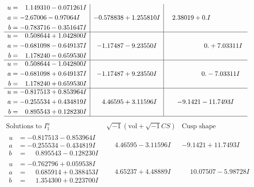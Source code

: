 \documentclass[1p]{elsarticle_modified}
\theoremstyle{definition}
\newcommand{\I}{\sqrt{-1}}
\begin{document}
$$\begin{array}{c|c|c}
\begin{aligned}
u &= \phantom{-}1.149310 - 0.071261 I \\
a &= -2.67006 - 0.97064 I \\
b &= -0.783716 - 0.351647 I\end{aligned}
 & -0.578838 + 1.255810 I & \phantom{-}2.38019 + 0. I\phantom{ +0.000000I} \\ \hline\begin{aligned}
u &= \phantom{-}0.508644 + 1.042800 I \\
a &= -0.681098 - 0.649137 I \\
b &= \phantom{-}1.178240 - 0.659530 I\end{aligned}
 & -1.17487 - 9.23550 I & \phantom{-0.000000 -}0. + 7.03311 I \\ \hline\begin{aligned}
u &= \phantom{-}0.508644 - 1.042800 I \\
a &= -0.681098 + 0.649137 I \\
b &= \phantom{-}1.178240 + 0.659530 I\end{aligned}
 & -1.17487 + 9.23550 I & \phantom{-0.000000 } 0. - 7.03311 I \\ \hline\begin{aligned}
u &= -0.817513 + 0.853964 I \\
a &= -0.255534 + 0.434819 I \\
b &= \phantom{-}0.895543 + 0.128230 I\end{aligned}
 & \phantom{-}4.46595 + 3.11596 I & -9.1421 - 11.7493 I\\
 \hline 
 \end{array}$$\newpage$$\begin{array}{c|c|c}  
\text{Solutions to }I^u_{1}& \I (\text{vol} + \sqrt{-1}CS) & \text{Cusp shape}\\
 \hline 
\begin{aligned}
u &= -0.817513 - 0.853964 I \\
a &= -0.255534 - 0.434819 I \\
b &= \phantom{-}0.895543 - 0.128230 I\end{aligned}
 & \phantom{-}4.46595 - 3.11596 I & -9.1421 + 11.7493 I \\ \hline\begin{aligned}
u &= -0.762796 + 0.059538 I \\
a &= \phantom{-}0.685914 + 0.388453 I \\
b &= \phantom{-}1.354300 + 0.223700 I\end{aligned}
 & \phantom{-}4.65237 + 4.48889 I & \phantom{-}10.07507 - 5.98728 I \\ \hline\begin{aligned}

\end{aligned}
\end{array}$$
\end{document}
